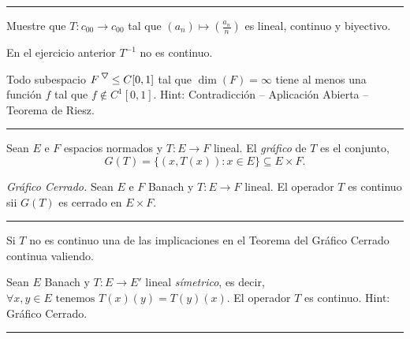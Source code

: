 \E

\hrule 
\begin{exercise}
    Muestre que  \(T: c_{00}\to c_{00}\) tal que \((a_n)\mapsto \left(\frac{a_n}{n}\right)\) es lineal, continuo y biyectivo. 
\end{exercise}
\begin{example}
    En el ejercicio anterior \(T^{-1}\) no es continuo.  
\end{example}
\begin{example}
    Todo subespacio \(F^\ce\leq C[0,1]\) tal que \(\dim (F) = \infty \) tiene al menos una función \(f\) tal que \(f\notin C^1[0,1]\). Hint: Contradicción -- Aplicación Abierta -- Teorema de Riesz. 
\end{example}
\hrule 

\E

\begin{definition}
    Sean \(E \text{ e } F\) espacios normados y \(T:E\to F\) lineal. El \emph{gráfico} de \(T\) es el conjunto, 
    \[G(T) = \{(x,T(x)):x\in E\}\subseteq E\times F. \]
\end{definition}
\begin{theorem}
    \emph{Gráfico Cerrado.} Sean \(E \text{ e } F\) Banach y \(T:E\to F\) lineal. El operador \(T\) es continuo sii \(G(T)\) es cerrado en \(E\times F\). 
\end{theorem}

\E

\hrule 
\begin{exercise}
    Si \(T\) no es continuo una de las implicaciones en el Teorema del Gráfico Cerrado continua valiendo. 
\end{exercise}
\begin{example}
    Sean \(E\) Banach y \(T:E\to E'\) lineal \emph{símetrico}, es decir, \(\forall x,y\in E \text{ tenemos }T(x)(y)=T(y)(x)\). El operador \(T\) es continuo. Hint: Gráfico Cerrado. 
\end{example}
\hrule 
